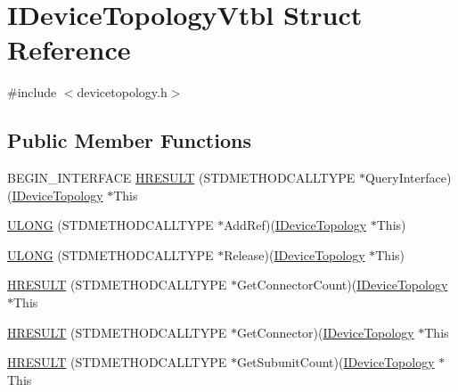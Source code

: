 \hypertarget{struct_i_device_topology_vtbl}{}\section{I\+Device\+Topology\+Vtbl Struct Reference}
\label{struct_i_device_topology_vtbl}


{\ttfamily \#include $<$devicetopology.\+h$>$}

\subsection*{Public Member Functions}
\begin{DoxyCompactItemize}
\item 
B\+E\+G\+I\+N\+\_\+\+I\+N\+T\+E\+R\+F\+A\+CE \hyperlink{struct_i_device_topology_vtbl_ab746c03f1cac55a919e2dccfa43d61e8}{H\+R\+E\+S\+U\+LT} (S\+T\+D\+M\+E\+T\+H\+O\+D\+C\+A\+L\+L\+T\+Y\+PE $\ast$Query\+Interface)(\hyperlink{devicetopology_8h_a4997c6c4616c3245d515eafd2ce686d0}{I\+Device\+Topology} $\ast$This
\item 
\hyperlink{struct_i_device_topology_vtbl_aa9b44bc8644523c2e928755675ffa568}{U\+L\+O\+NG} (S\+T\+D\+M\+E\+T\+H\+O\+D\+C\+A\+L\+L\+T\+Y\+PE $\ast$Add\+Ref)(\hyperlink{devicetopology_8h_a4997c6c4616c3245d515eafd2ce686d0}{I\+Device\+Topology} $\ast$This)
\item 
\hyperlink{struct_i_device_topology_vtbl_ab9c0248388b77c51d09f3e5ceae345db}{U\+L\+O\+NG} (S\+T\+D\+M\+E\+T\+H\+O\+D\+C\+A\+L\+L\+T\+Y\+PE $\ast$Release)(\hyperlink{devicetopology_8h_a4997c6c4616c3245d515eafd2ce686d0}{I\+Device\+Topology} $\ast$This)
\item 
\hyperlink{struct_i_device_topology_vtbl_a533b959d2bc0eed681c0bc1f2654804d}{H\+R\+E\+S\+U\+LT} (S\+T\+D\+M\+E\+T\+H\+O\+D\+C\+A\+L\+L\+T\+Y\+PE $\ast$Get\+Connector\+Count)(\hyperlink{devicetopology_8h_a4997c6c4616c3245d515eafd2ce686d0}{I\+Device\+Topology} $\ast$This
\item 
\hyperlink{struct_i_device_topology_vtbl_a459d66e715f34f6fcc286dd54532b360}{H\+R\+E\+S\+U\+LT} (S\+T\+D\+M\+E\+T\+H\+O\+D\+C\+A\+L\+L\+T\+Y\+PE $\ast$Get\+Connector)(\hyperlink{devicetopology_8h_a4997c6c4616c3245d515eafd2ce686d0}{I\+Device\+Topology} $\ast$This
\item 
\hyperlink{struct_i_device_topology_vtbl_af9db4e499eb1c4b474388d4cc2ea2c68}{H\+R\+E\+S\+U\+LT} (S\+T\+D\+M\+E\+T\+H\+O\+D\+C\+A\+L\+L\+T\+Y\+PE $\ast$Get\+Subunit\+Count)(\hyperlink{devicetopology_8h_a4997c6c4616c3245d515eafd2ce686d0}{I\+Device\+Topology} $\ast$This

\end{DoxyCompactItemize}

